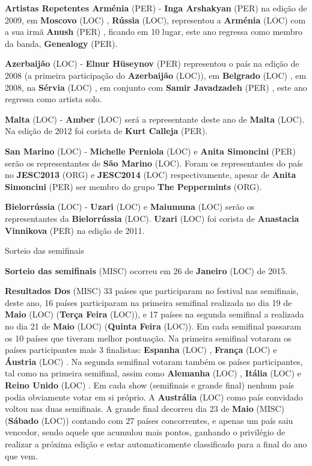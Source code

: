\documentclass[12pt,a4paper]{article}
\begin{document}
\textbf{Artistas Repetentes Arménia} (PER) - \textbf{Inga Arshakyan} (PER) na edição de 2009, em \textbf{Moscovo} (LOC) , \textbf{Rússia} (LOC), representou a \textbf{Arménia} (LOC) com a sua irmã \textbf{Anush} (PER) , ficando em 10 lugar, este ano regressa como membro da banda, \textbf{Genealogy} (PER).

\textbf{Azerbaijão} (LOC) - \textbf{Elnur Hüseynov} (PER) representou o país na edição de 2008 (a primeira participação do \textbf{Azerbaijão} (LOC)), em \textbf{Belgrado} (LOC) , em 2008, na \textbf{Sérvia} (LOC) , em conjunto com \textbf{Samir Javadzadeh} (PER) , este ano regressa como artista solo.

\textbf{Malta} (LOC) - \textbf{Amber} (LOC) será a representante deste ano de \textbf{Malta} (LOC). Na edição de 2012 foi corista de \textbf{Kurt Calleja} (PER).

\textbf{San Marino} (LOC) - \textbf{Michelle Perniola} (LOC) e \textbf{Anita Simoncini} (PER) serão os representantes de \textbf{São Marino} (LOC). Foram os representantes do país no \textbf{JESC2013} (ORG) e \textbf{JESC2014} (LOC) respectivamente, apesar de \textbf{Anita Simoncini} (PER) ser membro do grupo \textbf{The Peppermints} (ORG).

\textbf{Bielorrússia} (LOC) - \textbf{Uzari} (LOC) e \textbf{Maiumuna} (LOC) serão os representantes da \textbf{Bielorrússia} (LOC). \textbf{Uzari} (LOC) foi corista de \textbf{Anastacia Vinnikova} (PER) na edição de 2011.



Sorteio das semifinais

\textbf{Sorteio das semifinais} (MISC) ocorreu em 26 de \textbf{Janeiro} (LOC) de 2015.



\textbf{Resultados Dos} (MISC) 33 países que participaram no festival nas semifinais, deste ano, 16 países participaram na primeira semifinal realizada no dia 19 de \textbf{Maio} (LOC) (\textbf{Terça Feira} (LOC)), e 17 países na segunda semifinal a realizada no dia 21 de \textbf{Maio} (LOC) (\textbf{Quinta Feira} (LOC)). Em cada semifinal passaram os 10 países que tiveram melhor pontuação. Na primeira semifinal votaram os países participantes mais 3 finalistas: \textbf{Espanha} (LOC) , \textbf{França} (LOC) e \textbf{Áustria} (LOC) . Na segunda semifinal votaram também os países participantes, tal como na primeira semifinal, assim como \textbf{Alemanha} (LOC) , \textbf{Itália} (LOC) e \textbf{Reino Unido} (LOC) . Em cada show (semifinais e grande final) nenhum país podia obviamente votar em si próprio. A \textbf{Austrália} (LOC) como país convidado voltou nas duas semifinais. A grande final decorreu dia 23 de \textbf{Maio} (MISC) (\textbf{Sábado} (LOC)) contando com 27 países concorrentes, e apenas um país saiu vencedor, sendo aquele que acumulou mais pontos, ganhando o privilégio de realizar a próxima edição e estar automaticamente classificado para a final do ano que vem.
\end{document}
